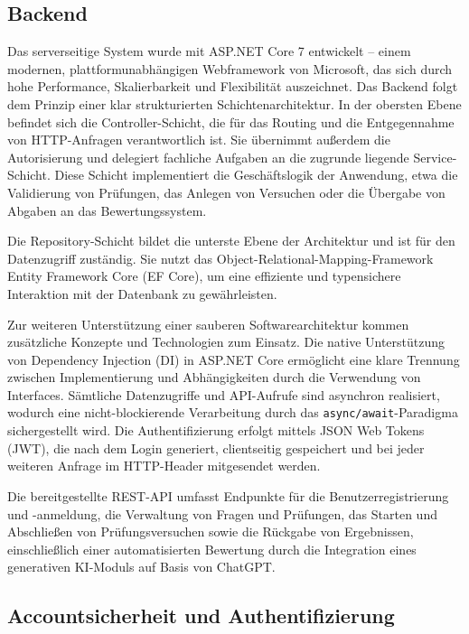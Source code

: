 \documentclass[a4paper,12pt]{article}
\begin{document}
\subsection{Backend}

Das serverseitige System wurde mit ASP.NET Core 7 entwickelt – einem modernen, plattformunabhängigen Webframework von Microsoft, das sich durch hohe Performance, Skalierbarkeit und Flexibilität auszeichnet. Das Backend folgt dem Prinzip einer klar strukturierten Schichtenarchitektur. In der obersten Ebene befindet sich die Controller-Schicht, die für das Routing und die Entgegennahme von HTTP-Anfragen verantwortlich ist. Sie übernimmt außerdem die Autorisierung und delegiert fachliche Aufgaben an die zugrunde liegende Service-Schicht. Diese Schicht implementiert die Geschäftslogik der Anwendung, etwa die Validierung von Prüfungen, das Anlegen von Versuchen oder die Übergabe von Abgaben an das Bewertungssystem.

Die Repository-Schicht bildet die unterste Ebene der Architektur und ist für den Datenzugriff zuständig. Sie nutzt das Object-Relational-Mapping-Framework Entity Framework Core (EF Core), um eine effiziente und typensichere Interaktion mit der Datenbank zu gewährleisten.

Zur weiteren Unterstützung einer sauberen Softwarearchitektur kommen zusätzliche Konzepte und Technologien zum Einsatz. Die native Unterstützung von Dependency Injection (DI) in ASP.NET Core ermöglicht eine klare Trennung zwischen Implementierung und Abhängigkeiten durch die Verwendung von Interfaces. Sämtliche Datenzugriffe und API-Aufrufe sind asynchron realisiert, wodurch eine nicht-blockierende Verarbeitung durch das \texttt{async/await}-Paradigma sichergestellt wird. Die Authentifizierung erfolgt mittels JSON Web Tokens (JWT), die nach dem Login generiert, clientseitig gespeichert und bei jeder weiteren Anfrage im HTTP-Header mitgesendet werden.

Die bereitgestellte REST-API umfasst Endpunkte für die Benutzerregistrierung und -anmeldung, die Verwaltung von Fragen und Prüfungen, das Starten und Abschließen von Prüfungsversuchen sowie die Rückgabe von Ergebnissen, einschließlich einer automatisierten Bewertung durch die Integration eines generativen KI-Moduls auf Basis von ChatGPT.


\subsection{Accountsicherheit und Authentifizierung}
\end{document}
